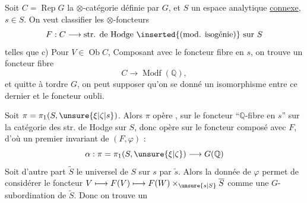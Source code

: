 Soit $C=\operatorname{Rep}G$ la $\otimes$-catégorie définie par $G$, et $S$ un espace analytique \uline{connexe}, $s\in S$. On veut classifier les $\otimes$-foncteurs
\[
F:C\longrightarrow\text{str. de Hodge \inserted{(mod. isogénie)} sur }S
\]
telles que c) Pour   $V\in\operatorname{Ob}C$,  
Composant avec le foncteur fibre en $s$, on trouve un foncteur fibre
\[
C\longrightarrow\operatorname{Modf}(\mathbb{Q}),
\]
et quitte à tordre $G$, on peut supposer qu'on se donné un isomorphisme \inserted{$\varphi$} entre ce dernier et le foncteur oubli.

 Soit $\pi=\pi_1(S,\unsure{\xi|\zeta|s})$. Alors $\pi$ opère , sur le foncteur  ``$\mathbb{Q}$-fibre en $s$'' sur la catégorie des str. de Hodge sur $S$, donc opère sur le foncteur composé avec $F$, d'où un premier invariant de $(F,\varphi)$ :
\[
\alpha:\pi=\pi_1(S,\unsure{\xi|\zeta})\longrightarrow G(\mathbb{Q})
\]
Soit d'autre part $\widetilde{S}$ le  universel de $S$   sur $s$ par $\widetilde{s}$. Alors la donnée de $\varphi$ permet de considérer le foncteur $V\longmapsto F(V)\longmapsto F(W)\times_{\unsure{s|S}}\overline{S}$ comme une $G$-subordination de $\widetilde{S}$. Donc on trouve un

